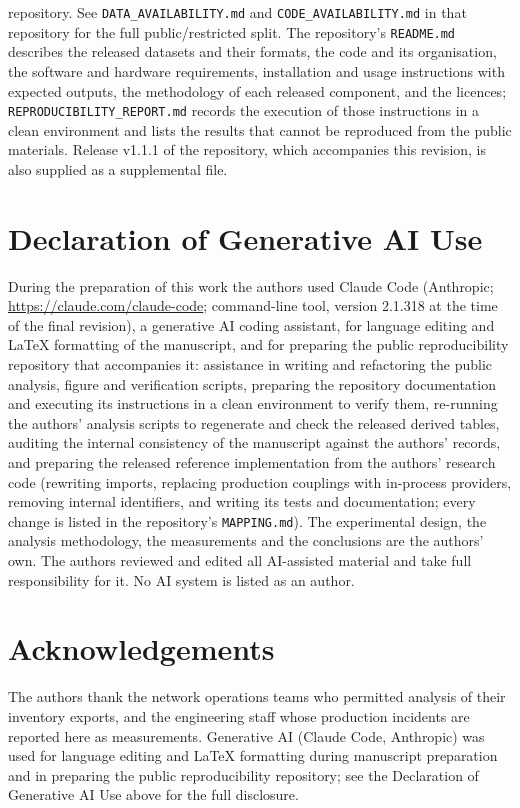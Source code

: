 \documentclass[fleqn,10pt,lineno]{wlpeerj}
\begin{document}
repository. See \texttt{DATA\_AVAILABILITY.md} and \texttt{CODE\_AVAILABILITY.md} in that repository for the full public/restricted split. The repository's \texttt{README.md} describes the released datasets and their formats, the code and its organisation, the software and hardware requirements, installation and usage instructions with expected outputs, the methodology of each released component, and the licences; \texttt{REPRODUCIBILITY\_REPORT.md} records the execution of those instructions in a clean environment and lists the results that cannot be reproduced from the public materials. Release v1.1.1 of the repository, which accompanies this revision, is also supplied as a supplemental file.

\section*{Declaration of Generative AI Use}
During the preparation of this work the authors used Claude Code (Anthropic; \url{https://claude.com/claude-code}; command-line tool, version 2.1.318 at the time of the final revision), a generative AI coding assistant, for language editing and \LaTeX{} formatting of the manuscript, and for preparing the public reproducibility repository that accompanies it: assistance in writing and refactoring the public analysis, figure and verification scripts, preparing the repository documentation and executing its instructions in a clean environment to verify them, re-running the authors' analysis scripts to regenerate and check the released derived tables, auditing the internal consistency of the manuscript against the authors' records, and preparing the released reference implementation from the authors' research code (rewriting imports, replacing production couplings with in-process providers, removing internal identifiers, and writing its tests and documentation; every change is listed in the repository's \texttt{MAPPING.md}). The experimental design, the analysis methodology, the measurements and the conclusions are the authors' own. The authors reviewed and edited all AI-assisted material and take full responsibility for it. No AI system is listed as an author.

\section*{Acknowledgements}
The authors thank the network operations teams who permitted analysis of their inventory exports, and the engineering staff whose production incidents are reported here as measurements. Generative AI (Claude Code, Anthropic) was used for language editing and \LaTeX{} formatting during manuscript preparation and in preparing the public reproducibility repository; see the Declaration of Generative AI Use above for the full disclosure.


\end{document}
